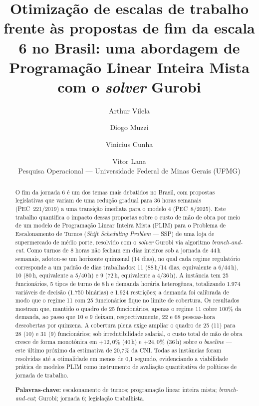 \documentclass[12pt,a4paper]{article}
\title{\textbf{Otimização de escalas de trabalho frente às propostas de fim da
escala 6\texttimes 1 no Brasil: uma abordagem de Programação Linear Inteira
Mista com o \emph{solver} Gurobi}}
\author{Arthur Vilela \and Diogo Muzzi \and Vinicius Cunha \and Vitor Lana\\[4pt]
\small Pesquisa Operacional --- Universidade Federal de Minas Gerais (UFMG)}
\date{}
\begin{document}
\maketitle

\begin{abstract}
\noindent O fim da jornada 6 é um dos temas mais debatidos no
Brasil, com propostas legislativas que variam de uma redução gradual para 36
horas semanais (PEC~221/2019) a uma transição imediata para o modelo
4 (PEC~8/2025). Este trabalho quantifica o impacto dessas
propostas sobre o custo de mão de obra por meio de um modelo de Programação
Linear Inteira Mista (PLIM) para o Problema de Escalonamento de Turnos
(\emph{Shift Scheduling Problem} --- SSP) de uma loja de supermercado de
médio porte, resolvido com o \emph{solver} Gurobi via algoritmo
\emph{branch-and-cut}. Como turnos de 8 horas não fecham em dias inteiros
sob a jornada de 44\,h semanais, adotou-se um horizonte quinzenal (14 dias),
no qual cada regime regulatório corresponde a um padrão de dias trabalhados:
11 (88\,h/14 dias, equivalente a 6/44\,h),
10 (80\,h, equivalente a 5/40\,h) e 9
(72\,h, equivalente a 4/36\,h). A instância tem 25 funcionários,
5 tipos de turno de 8\,h e demanda horária heterogênea, totalizando 1.974
variáveis de decisão (1.750 binárias) e 1.924 restrições; a demanda foi
calibrada de modo que o regime 11 com 25 funcionários fique no
limite de cobertura. Os resultados mostram que, mantido o quadro de 25
funcionários, apenas o regime 11 cobre 100\% da demanda, ao passo
que 10 e 9 deixam, respectivamente, 22 e 68
pessoas-hora descobertas por quinzena. A cobertura plena exige ampliar o
quadro de 25 (11) para 28 (10) e 31 (9)
funcionários; sob irredutibilidade salarial, o custo total de mão de obra
cresce de forma monotônica em $+12{,}0\%$ (40\,h) e $+24{,}0\%$ (36\,h) sobre
o \emph{baseline} --- este último próximo da estimativa de 20,7\% da CNI.
Todas as instâncias foram resolvidas até a otimalidade em menos de 0,1
segundo, evidenciando a viabilidade prática de modelos PLIM como instrumento
de avaliação quantitativa de políticas de jornada de trabalho.

\medskip
\noindent\textbf{Palavras-chave:} escalonamento de turnos; programação linear
inteira mista; \emph{branch-and-cut}; Gurobi; jornada 6;
legislação trabalhista.
\end{abstract}
\end{document}
